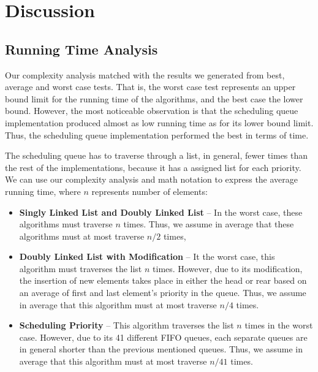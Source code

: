 \documentclass[a4paper,11pt]{kth-mag}
\newcommand*{\skippara}{\par\vspace{\baselineskip} \noindent}
\begin{document}
\section{Discussion}
\subsection{Running Time Analysis}
Our complexity analysis matched with the results we generated from best, average and worst case tests.
That is, the worst case test represents an upper bound limit for the running time of the algorithms, and the best case the lower bound.
However, the most noticeable observation is that the scheduling queue implementation produced almost as low running time as for its lower bound limit.
Thus, the scheduling queue implementation performed the best in terms of time.

\skippara The scheduling queue has to traverse through a list, in general, fewer times than the rest of the implementations, because it has a assigned list for each priority.
We can use our complexity analysis and math notation to express the average running time, where $n$ represents number of elements:
\begin{itemize}
    \item \textbf{Singly Linked List and Doubly Linked List} -- In the worst case, these algorithms must traverse $n$ times.
        Thus, we assume in average that these algorithms must at most traverse $n/2$ times,
    \item \textbf{Doubly Linked List with Modification} -- It the worst case, this algorithm must traverses the list $n$ times.
        However, due to its modification, the insertion of new elements takes place in either the head or rear based on an average of first and last element's priority in the queue.
        Thus, we assume in average that this algorithm must at most traverse $n/4$ times.
    \item \textbf{Scheduling Priority} -- This algorithm traverses the list $n$ times in the worst case.
        However, due to its 41 different FIFO queues, each separate queues are in general shorter than the previous mentioned queues.
        Thus, we assume in average that this algorithm must at most traverse $n/41$ times.
\end{itemize}
\end{document}
